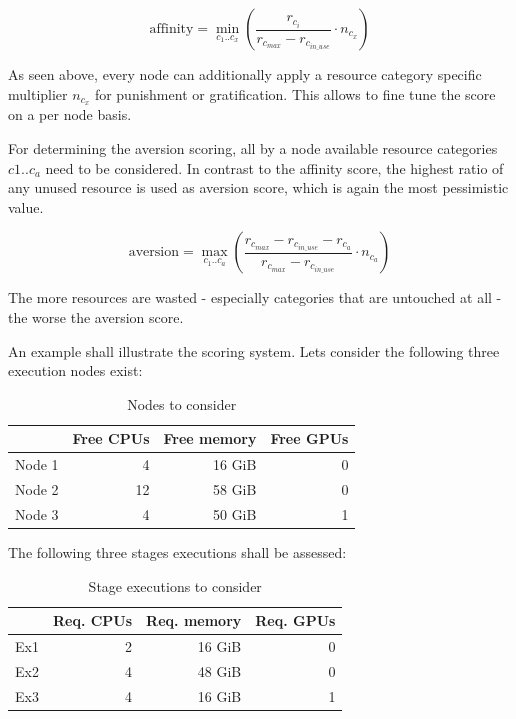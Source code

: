 \begin{equation}
	\label{election:eq:affinity}
	\text{affinity} = \min_{c_1 .. c_x} \left( \frac{r_{c_i}}{r_{c_{max}} - r_{c_{in\_use}}} \cdot n_{c_x} \right)
\end{equation}

As seen above, every node can additionally apply a resource category specific multiplier $n_{c_x}$ for punishment or gratification.
This allows to fine tune the score on a per node basis.

For determining the aversion scoring, all by a node available resource categories $c1 .. c_a$ need to be considered.
In contrast to the affinity score, the highest ratio of any unused resource is used as aversion score, which is again the most pessimistic value.

\begin{equation}
	\label{election:eq:aversion}
	\text{aversion} = \max_{c_1 .. c_a} \left( \frac{r_{c_{max}} - r_{c_{in\_use}} - r_{c_a}}{r_{c_{max}}  - r_{c_{in\_use}}} \cdot n_{c_a} \right)
\end{equation}

The more resources are wasted - especially categories that are untouched at all - the worse the aversion score.

An example shall illustrate the scoring system.
Lets consider the following three execution nodes exist:

\begin{table}[H]
	\centering
	\begin{tabular}{|l|r|r|r|}\hline
		 & Free CPUs & Free memory & Free GPUs \\
		 \hline
		 Node 1 & 4  	& 16 GiB & 0 \\
		 Node 2 & 12 	& 58 GiB & 0 \\
		 Node 3 & 4 	& 50 GiB & 1 \\ \hline
	\end{tabular}
	\caption{Nodes to consider}
\end{table}

The following three stages executions shall be assessed:

\begin{table}[H]
	\centering
	\begin{tabular}{|l|r|r|r|}\hline
		& Req. CPUs & Req. memory & Req. GPUs \\
		\hline
		Ex1 & 2 & 16 GiB & 0 \\
		Ex2 & 4 & 48 GiB & 0 \\
		Ex3 & 4 & 16 GiB & 1 \\ \hline
	\end{tabular}
	\caption{Stage executions to consider}
\end{table}

